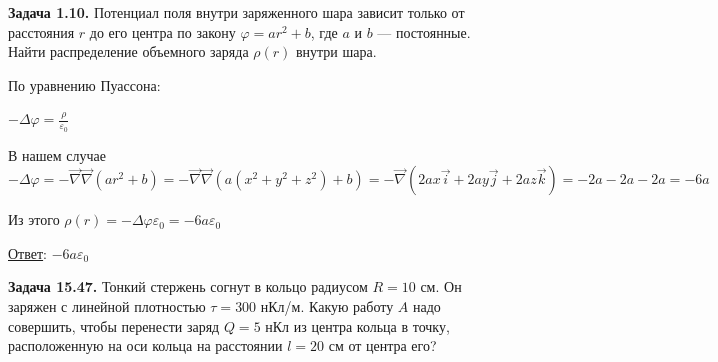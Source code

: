 \documentclass[12pt]{article}
\begin{document}
\begin{tcolorbox}
    \textbf{Задача 1.10.} Потенциал поля внутри заряженного шара зависит только от
    расстояния $r$ до его центра по закону $\varphi = ar^2 + b$, где $a$ и $b$ — постоянные. 
    Найти распределение объемного заряда $\rho(r)$ внутри
    шара.
\end{tcolorbox}

\begin{minipage}{\textwidth}
    \begin{figure}
    \end{figure}

    По уравнению Пуассона:

    $-\Delta \varphi = \frac{\rho}{\varepsilon_0}$

    В нашем случае $-\Delta \varphi = -\vec\nabla\vec\nabla(ar^2 + b) = -\vec\nabla\vec\nabla(a(x^2 + y^2 + z^2) + b) = 
    -\vec\nabla\left(2ax\vec{i} + 2ay\vec{j} + 2az\vec{k}\right) = -2a - 2a - 2a = -6a$

    Из этого $\rho(r) = -\Delta \varphi \varepsilon_0 = -6a\varepsilon_0$
\end{minipage}

\bigvspace

\underline{Ответ}: $-6a\varepsilon_0$


\begin{tcolorbox}
    \textbf{Задача 15.47.} Тонкий стержень согнут в кольцо радиусом $R = 10$ см.
    Он заряжен с линейной плотностью $\tau = 300$ нКл/м. Какую работу
    $A$ надо совершить, чтобы перенести заряд $Q = 5$ нКл из центра кольца в точку,
    расположенную на оси кольца на расстоянии $l = 20$ см от центра его?
\end{tcolorbox}
\end{document}
